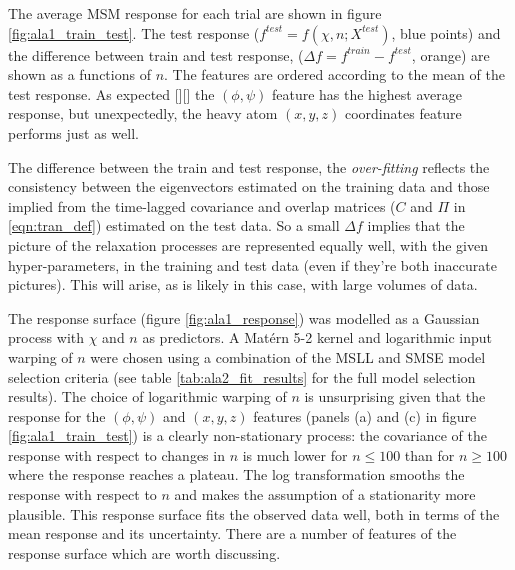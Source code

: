 The average MSM response for each trial are shown in figure \ref{fig:ala1_train_test}. The test response ($f^{test} = f(\chi, n; X^{test})$, blue points) and the difference between train and test response, ($\Delta f = f^{train} - f^{test}$, orange) are shown as a functions of $n$. The features are ordered according to the  mean of the test response. As expected [][] the  $(\phi, \psi)$ feature has the highest average response, but unexpectedly, the heavy atom $(x,y,z)$ coordinates feature performs just as well. 

The difference between the train and test response, the \emph{over-fitting} reflects the consistency between the eigenvectors estimated on the training data and those implied from the time-lagged covariance and overlap matrices ($C$ and $\Pi$  in \ref{eqn:tran_def}) estimated  on the test data. So a small $\Delta f$ implies that the picture of the relaxation processes are represented equally well, with the given hyper-parameters, in the training and test data (even if they're both inaccurate pictures). This will arise, as is likely in this case, with large volumes of data.    

The response surface (figure \ref{fig:ala1_response}) was modelled as a Gaussian process with $\chi$ and $n$ as predictors. A Mat\'{e}rn 5-2 kernel and logarithmic input warping of $n$ were chosen using a combination of the MSLL and SMSE model selection criteria (see table \ref{tab:ala2_fit_results} for the full model selection results). The choice of logarithmic warping of $n$ is unsurprising given that the response for the $(\phi, \psi)$ and $(x,y,z)$ features (panels (a) and (c) in figure \ref{fig:ala1_train_test}) is a clearly non-stationary process: the covariance of the response with respect to changes in $n$ is much lower for $n\leq 100$ than for $n\geq 100$ where the response reaches a plateau. The log transformation smooths the response with respect to $n$ and makes the assumption of a stationarity more plausible.  This response surface fits the observed data well, both in terms of the mean response and its uncertainty. There are a number of features of the response surface which are worth discussing. 

